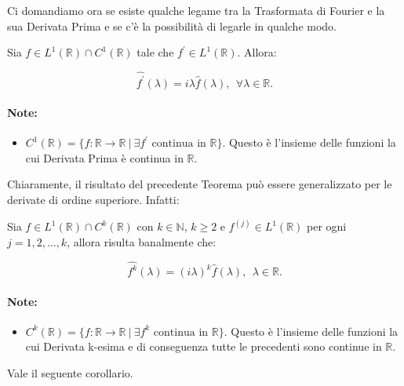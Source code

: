 Ci domandiamo ora se esiste qualche legame tra la Trasformata di Fourier e la
sua Derivata Prima e se c'è la possibilità di legarle in qualche modo.

\begin{theorem}
    Sia $f \in L^1(\mathbb{R}) \cap C^1(\mathbb{R})$ tale che $f^{\prime} \in
        L^1(\mathbb{R})$. Allora:
    
    $$
        \widehat{f^{\prime}}(\lambda) = i \lambda \hat{f}(\lambda), \ \ \forall
        \lambda \in \mathbb{R}.
    $$
\end{theorem}

\paragraph{Note:}
\begin{itemize}
    \item $C^1(\mathbb{R}) = \{ f: \mathbb{R} \rightarrow \mathbb{R} \ | \
              \exists f^{\prime} \text{ continua in } \mathbb{R} \}$. Questo è
          l'insieme delle funzioni la cui Derivata Prima è continua in
          $\mathbb{R}$.
\end{itemize}

Chiaramente, il risultato del precedente Teorema può essere generalizzato per le
derivate di ordine superiore. Infatti:

\begin{theorem}
    Sia $f \in L^1(\mathbb{R}) \cap C^k(\mathbb{R})$ con $k \in \mathbb{N}$, $k
        \geq 2$ e $f^{\left(j\right)} \in L^1(\mathbb{R})$ per ogni $j = 1, 2,
        \ldots, k$, allora risulta banalmente che:
    
    $$
        \widehat{f^k}(\lambda) = (i \lambda)^k \hat{f}(\lambda), \ \ \lambda \in
        \mathbb{R}.
    $$
\end{theorem}

\paragraph{Note:}
\begin{itemize}
    \item $C^k(\mathbb{R}) = \{ f: \mathbb{R} \rightarrow \mathbb{R} \ | \
              \exists f^{k} \text{ continua in } \mathbb{R} \}$. Questo è
          l'insieme delle funzioni la cui Derivata k-esima e di conseguenza tutte le precedenti sono continue in
          $\mathbb{R}$.
\end{itemize}

Vale il seguente corollario.

